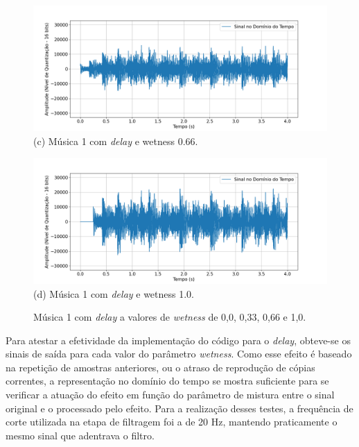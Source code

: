 \begin{figure}[htpb]
    \begin{minipage}[b]{0.7\textwidth}
        \centering
        \includegraphics[width=\textwidth]{figuras/fig91.png}
        \vspace{0.3cm} %
        (c) Música 1 com \textit{delay} e wetness 0.66.
    \end{minipage}
    \hspace{0.5cm} %

    \begin{minipage}[b]{0.7\textwidth}
        \centering
        \includegraphics[width=\textwidth]{figuras/fig92.png}
        \vspace{0.3cm} %
        (d) Música 1 com \textit{delay} e wetness 1.0.
    \end{minipage}

    \caption{Música 1 com \textit{delay} a valores de \textit{wetness} de 0,0, 0,33, 0,66 e 1,0.}
    \label{fig89}
\end{figure}



Para atestar a efetividade da implementação do código para o \textit{delay}, obteve-se os sinais de saída para cada valor do parâmetro \textit{wetness}. Como esse efeito é baseado na repetição de amostras anteriores, ou o atraso de reprodução de cópias correntes, a representação no domínio do tempo se mostra suficiente para se verificar a atuação do efeito em função do parâmetro de mistura entre o sinal original e o processado pelo efeito. 
Para a realização desses testes, a frequência de corte utilizada na etapa de filtragem foi a de 20 Hz, mantendo praticamente o mesmo sinal que adentrava o filtro. %

